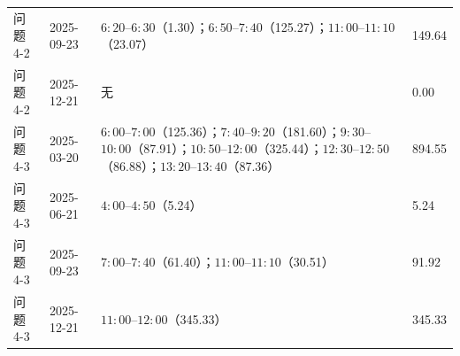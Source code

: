 \begin{table}[htbp]
\begin{tabular}{C{1.35cm} C{1.85cm} L{8.10cm} C{1.85cm}}
    问题 4-2 & 2025-09-23 & \(6{:}20\)--\(6{:}30\)（1.30）；\(6{:}50\)--\(7{:}40\)（125.27）；\(11{:}00\)--\(11{:}10\)（23.07） & 149.64 \\
    问题 4-2 & 2025-12-21 & 无 & 0.00 \\
    \midrule
    问题 4-3 & 2025-03-20 & \(6{:}00\)--\(7{:}00\)（125.36）；\(7{:}40\)--\(9{:}20\)（181.60）；\(9{:}30\)--\(10{:}00\)（87.91）；\(10{:}50\)--\(12{:}00\)（325.44）；\(12{:}30\)--\(12{:}50\)（86.88）；\(13{:}20\)--\(13{:}40\)（87.36） & 894.55 \\
    问题 4-3 & 2025-06-21 & \(4{:}00\)--\(4{:}50\)（5.24） & 5.24 \\
    问题 4-3 & 2025-09-23 & \(7{:}00\)--\(7{:}40\)（61.40）；\(11{:}00\)--\(11{:}10\)（30.51） & 91.92 \\
    问题 4-3 & 2025-12-21 & \(11{:}00\)--\(12{:}00\)（345.33） & 345.33 \\
    \bottomrule
  \end{tabular}
\end{table}

